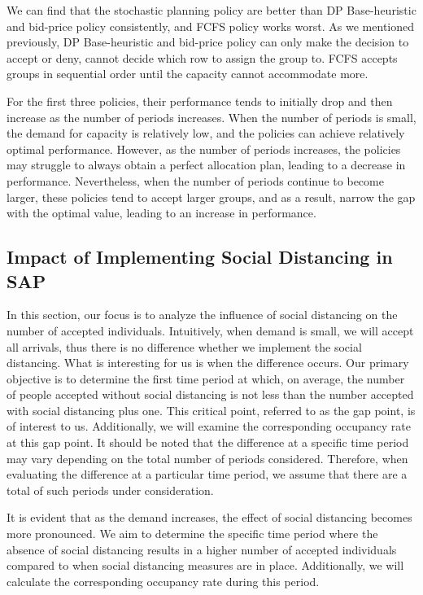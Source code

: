 We can find that the stochastic planning policy are better than DP Base-heuristic and bid-price policy consistently, and FCFS policy works worst. As we mentioned previously, DP Base-heuristic and bid-price policy can only make the decision to accept or deny, cannot decide which row to assign the group to. FCFS accepts groups in sequential order until the capacity cannot accommodate more.


For the first three policies, their performance tends to initially drop and then increase as the number of periods increases. When the number of periods is small, the demand for capacity is relatively low, and the policies can achieve relatively optimal performance. However, as the number of periods increases, the policies may struggle to always obtain a perfect allocation plan, leading to a decrease in performance. Nevertheless, when the number of periods continue to become larger, these policies tend to accept larger groups, and as a result, narrow the gap with the optimal value, leading to an increase in performance.


\subsection{Impact of Implementing Social Distancing in SAP}
In this section, our focus is to analyze the influence of social distancing on the number of accepted individuals. Intuitively, when demand is small, we will accept all arrivals, thus there is no difference whether we implement the social distancing. What is interesting for us is when the difference occurs. Our primary objective is to determine the first time period at which, on average, the number of people accepted without social distancing is not less than the number accepted with social distancing plus one. This critical point, referred to as the gap point, is of interest to us. Additionally, we will examine the corresponding occupancy rate at this gap point. It should be noted that the difference at a specific time period may vary depending on the total number of periods considered. Therefore, when evaluating the difference at a particular time period, we assume that there are a total of such periods under consideration.


It is evident that as the demand increases, the effect of social distancing becomes more pronounced. We aim to determine the specific time period where the absence of social distancing results in a higher number of accepted individuals compared to when social distancing measures are in place. Additionally, we will calculate the corresponding occupancy rate during this period.

